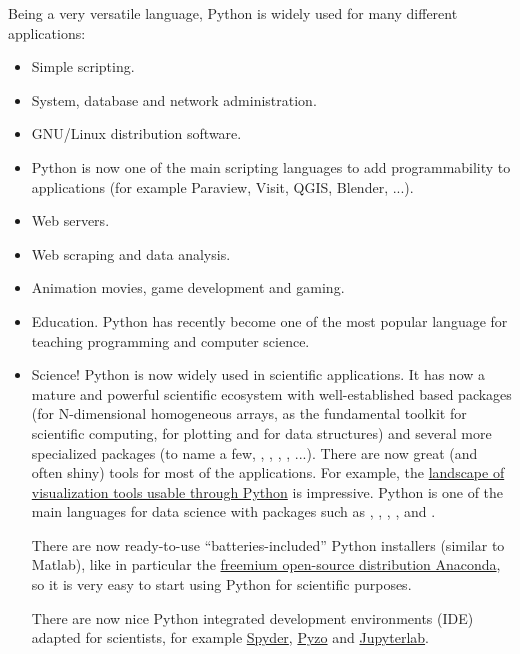 Being a very versatile language, Python is widely used for many different
applications:
\begin{itemize}
\item Simple scripting.

\item System, database and network administration.

\item GNU/Linux distribution software.

\item Python is now one of the main scripting languages to add programmability
to applications (for example Paraview, Visit, QGIS, Blender, ...).

\item Web servers.

\item Web scraping and data analysis.

\item Animation movies, game development and gaming.

\item Education. Python has recently become one of the most popular language
for teaching programming and computer science.

\item Science!
Python is now widely used in scientific applications. It has now a mature and
powerful scientific ecosystem with well-established based packages (\Numpy for
N-dimensional homogeneous arrays, \Scipy as the fundamental toolkit for
scientific computing,  for plotting and  for data
structures) and several more specialized packages (to name a few, ,
, , , ...). There are now great (and
often shiny) tools for most of the applications. For example, the
\href{https://github.com/rougier/python-visualization-landscape}{%
landscape of visualization tools usable through Python} is impressive.
%
Python is one of the main languages for data science with packages such as
, , , , 
and .

There are now ready-to-use ``batteries-included'' Python installers
(similar to Matlab), like in particular the
\href{https://en.wikipedia.org/wiki/Anaconda_(Python_distribution)}{%
freemium open-source distribution Anaconda}, so it is very easy to start using
Python for scientific purposes.

There are now nice Python integrated development environments (IDE) adapted for
scientists, for example \href{https://github.com/spyder-ide/spyder}{Spyder},
\href{http://www.pyzo.org/}{Pyzo} and
\href{https://jupyterlab.readthedocs.io}{Jupyterlab}.

\end{itemize}

